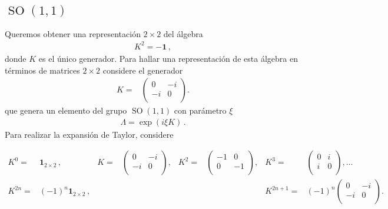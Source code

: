 \subsection{$\operatorname{SO}(1,1)$}
\begin{frame}
Queremos obtener una representación $2\times2$ del álgebra
\begin{align}
  K^2=-\boldsymbol{1}\,,
\end{align}
donde $K$ es el único generador. Para hallar una representación de esta álgebra en términos de matrices $2\times2$ considere el generador
\begin{align}
  K=&  \begin{pmatrix}
   0 &-i\\
   -i &0\\ 
  \end{pmatrix}. 
\end{align}
que genera un elemento del grupo $\operatorname{SO}(1,1)$ con parámetro $\xi$
\begin{align}
  \Lambda=\exp \left( i \xi K \right)\,.
\end{align}
Para realizar la expansión de Taylor, considere

\begin{align*}
  K^{0}=&\boldsymbol{1}_{2\times2}\,,&K=&
  \begin{pmatrix}
   0 &-i\\ %
   -i &0\\  %
  \end{pmatrix},&K^{2}=&  \begin{pmatrix}
   -1 &0\\
   0 &-1\\ 
  \end{pmatrix},&K^{3}=&  \begin{pmatrix}
   0 &i\\
   i &0\\ 
  \end{pmatrix},\ldots \nonumber\\
  K^{2n}=&(-1)^{n}\boldsymbol{1}_{2\times2}\,,&&
&&&K^{2n+1}=& (-1)^{n} \begin{pmatrix}
   0 &-i\\
   -i &0\\ 
  \end{pmatrix}. 
\end{align*}


\end{frame}
